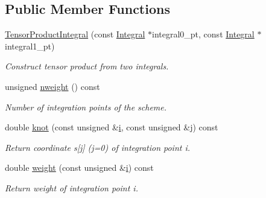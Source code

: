 \subsection*{Public Member Functions}
\begin{DoxyCompactItemize}
\item 
\hyperlink{classoomph_1_1TensorProductIntegral_3_012_01_4_add2a69abc8eccc5f769117d8b72548b6}{Tensor\+Product\+Integral} (const \hyperlink{classoomph_1_1Integral}{Integral} $\ast$integral0\+\_\+pt, const \hyperlink{classoomph_1_1Integral}{Integral} $\ast$integral1\+\_\+pt)
\begin{DoxyCompactList}\small\item\em Construct tensor product from two integrals. \end{DoxyCompactList}\item 
unsigned \hyperlink{classoomph_1_1TensorProductIntegral_3_012_01_4_aedb21a4d22fa37fb53b570aa6acc4ba3}{nweight} () const
\begin{DoxyCompactList}\small\item\em Number of integration points of the scheme. \end{DoxyCompactList}\item 
double \hyperlink{classoomph_1_1TensorProductIntegral_3_012_01_4_a046e53a0afa30ee500b56aae87179091}{knot} (const unsigned \&\hyperlink{cfortran_8h_adb50e893b86b3e55e751a42eab3cba82}{i}, const unsigned \&j) const
\begin{DoxyCompactList}\small\item\em Return coordinate s\mbox{[}j\mbox{]} (j=0) of integration point i. \end{DoxyCompactList}\item 
double \hyperlink{classoomph_1_1TensorProductIntegral_3_012_01_4_af9743733736f681784e675436a8dd20a}{weight} (const unsigned \&\hyperlink{cfortran_8h_adb50e893b86b3e55e751a42eab3cba82}{i}) const
\begin{DoxyCompactList}\small\item\em Return weight of integration point i. \end{DoxyCompactList}\end{DoxyCompactItemize}
